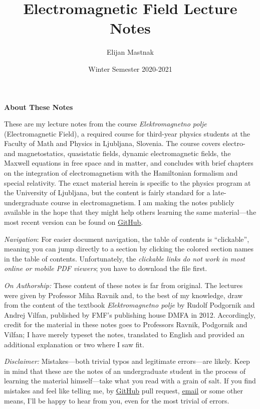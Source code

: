 \documentclass[11pt, a4paper]{article}
\begin{document}
\title{Electromagnetic Field Lecture Notes}
\author{Elijan Mastnak}
\date{Winter Semester 2020-2021}
\maketitle

\begin{center}
    \textbf{About These Notes}
\end{center}

These are my lecture notes from the course \textit{Elektromagnetno polje} (Electromagnetic Field), a required course for third-year physics students at the Faculty of Math and Physics in Ljubljana, Slovenia. The course covers electro- and magnetostatics, quasistatic fields, dynamic electromagnetic fields, the Maxwell equations in free space and in matter, and concludes with brief chapters on the integration of electromagnetism with the Hamiltonian formalism and special relativity. The exact material herein is specific to the physics program at the University of Ljubljana, but the content is fairly standard for a late-undergraduate course in electromagnetism. I am making the notes publicly available in the hope that they might help others learning the same material---the most recent version can be found on \href{https://github.com/ejmastnak/fmf/tree/main/electromagnetic-field}{\underline{GitHub}}.

\vspace{2mm}
\textit{Navigation}: For easier document navigation, the table of contents is ``clickable'', meaning you can jump directly to a section by clicking the colored section names in the table of contents. Unfortunately, the \textit{clickable links do not work in most online or mobile PDF viewers}; you have to download the file first.

\vspace{2mm}
\textit{On Authorship:} These content of these notes is far from original. The lectures were given by Professor Miha Ravnik and, to the best of my knowledge, draw from the content of the textbook \textit{Elektromagnetno polje} by Rudolf Podgornik and Andrej Vilfan, published by FMF's publishing house DMFA in 2012. Accordingly, credit for the material in these notes goes to Professors Ravnik, Podgornik and Vilfan; I have merely typeset the notes, translated to English and provided an additional explanation or two where I saw fit.

\vspace{2mm}
\textit{Disclaimer:} Mistakes---both trivial typos and legitimate errors---are likely. Keep in mind that these are the notes of an undergraduate student in the process of learning the material himself---take what you read with a grain of salt. If you find mistakes and feel like telling me, by \href{https://github.com/ejmastnak/fmf}{\underline{GitHub}} pull request, \href{mailto:ejmastnak@gmail.com}{\underline{email}} or some other means, I'll be happy to hear from you, even for the most trivial of errors.
\end{document}

